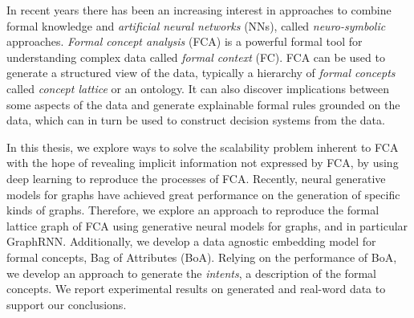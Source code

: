 %
In recent years there has been an increasing interest in approaches to combine formal knowledge and \textit{artificial neural networks} (NNs), called \textit{neuro-symbolic} approaches. %
\textit{Formal concept analysis} (FCA) is a powerful  formal tool for understanding complex data called \textit{formal context} (FC).
FCA can be used to generate a structured view of the data, typically a hierarchy of \textit{formal concepts} called \textit{concept lattice} or an ontology. It can also discover implications between some aspects of the data and generate explainable formal rules grounded on the data, which can in turn be used to construct decision systems from the data.

In this thesis, we explore ways to solve the scalability problem inherent to FCA with the hope of revealing implicit information not expressed by FCA, by using deep learning to reproduce the processes of FCA.
Recently, neural generative models for graphs have achieved great performance on the generation of specific kinds of graphs.
Therefore, we explore an approach to reproduce the formal lattice graph of FCA using generative neural models for graphs, and in particular GraphRNN.
Additionally, we develop a data agnostic embedding model for formal concepts, Bag of Attributes (BoA).
Relying on the performance of BoA, we develop an approach to generate the \textit{intents}, a description of the formal concepts.
We report experimental results on generated and real-word data to support our conclusions.